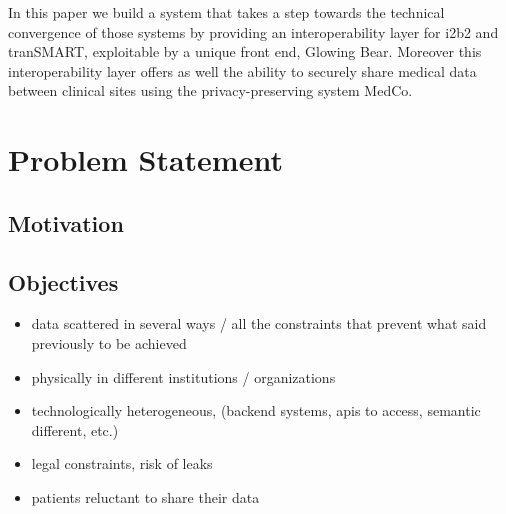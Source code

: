 In this paper we build a system that takes a step towards the technical convergence of those systems by providing an interoperability layer for i2b2 and tranSMART, exploitable by a unique front end, Glowing Bear.
Moreover this interoperability layer offers as well the ability to securely share medical data between clinical sites using the privacy-preserving system MedCo.


\section{Problem Statement}
\label{sec:problem}

\subsection*{Motivation}




\subsection*{Objectives}






\begin{itemize}
    \item data scattered in several ways / all the constraints that prevent what said previously to be achieved
    \item physically in different institutions / organizations
    \item technologically heterogeneous, (backend systems, apis to access, semantic different, etc.)
    \item legal constraints, risk of leaks
    \item  patients reluctant to share their data
\end{itemize}

